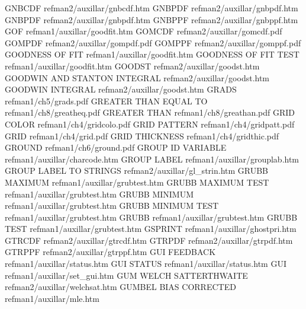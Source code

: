 GNBCDF                                  refman2/auxillar/gnbcdf.htm
GNBPDF                                  refman2/auxillar/gnbpdf.htm
GNBPDF                                  refman2/auxillar/gnbpdf.htm
GNBPPF                                  refman2/auxillar/gnbppf.htm
GOF                                     refman1/auxillar/goodfit.htm
GOMCDF                                  refman2/auxillar/gomcdf.pdf
GOMPDF                                  refman2/auxillar/gompdf.pdf
GOMPPF                                  refman2/auxillar/gomppf.pdf
GOODNESS OF FIT                         refman1/auxillar/goodfit.htm
GOODNESS OF FIT TEST                    refman1/auxillar/goodfit.htm
GOODST                                  refman2/auxillar/goodst.htm
GOODWIN AND STANTON INTEGRAL            refman2/auxillar/goodst.htm
GOODWIN INTEGRAL                        refman2/auxillar/goodst.htm
GRADS                                   refman1/ch5/grads.pdf
GREATER THAN EQUAL TO                   refman1/ch8/greatheq.pdf
GREATER THAN                            refman1/ch8/greathan.pdf
GRID COLOR                              refman1/ch4/gridcolo.pdf
GRID PATTERN                            refman1/ch4/gridpatt.pdf
GRID                                    refman1/ch4/grid.pdf
GRID THICKNESS                          refman1/ch4/gridthic.pdf
GROUND                                  refman1/ch6/ground.pdf
GROUP ID VARIABLE                       refman1/auxillar/charcode.htm
GROUP LABEL                             refman1/auxillar/grouplab.htm
GROUP LABEL TO STRINGS                  refman2/auxillar/gl_strin.htm
GRUBB MAXIMUM                           refman1/auxillar/grubtest.htm
GRUBB MAXIMUM TEST                      refman1/auxillar/grubtest.htm
GRUBB MINIMUM                           refman1/auxillar/grubtest.htm
GRUBB MINIMUM TEST                      refman1/auxillar/grubtest.htm
GRUBB                                   refman1/auxillar/grubtest.htm
GRUBB TEST                              refman1/auxillar/grubtest.htm
GSPRINT                                 refman1/auxillar/ghostpri.htm
GTRCDF                                  refman2/auxillar/gtrcdf.htm
GTRPDF                                  refman2/auxillar/gtrpdf.htm
GTRPPF                                  refman2/auxillar/gtrppf.htm
GUI FEEDBACK                            refman1/auxillar/status.htm
GUI STATUS                              refman1/auxillar/status.htm
GUI                                     refman1/auxillar/set_gui.htm
GUM WELCH SATTERTHWAITE                 refman2/auxillar/welchsat.htm
GUMBEL BIAS CORRECTED                   refman1/auxillar/mle.htm
